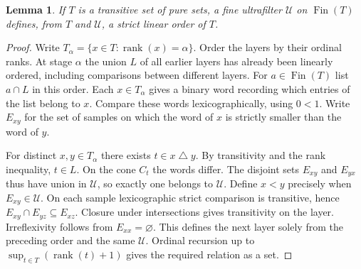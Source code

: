 \documentclass[11pt]{article}
\newtheorem{lemma}[theorem]{Lemma}
\newcommand{\Fin}{\operatorname{Fin}}
\newcommand{\UU}{\mathcal U}
\begin{document}
\begin{lemma}\label{order}
If $T$ is a transitive set of pure sets, a fine ultrafilter $\UU$ on $\Fin(T)$ defines, from $T$ and $\UU$, a strict linear order of $T$.
\end{lemma}
\begin{proof}
Write $T_\alpha=\{x\in T:\operatorname{rank}(x)=\alpha\}$. Order the layers by their ordinal ranks. At stage $\alpha$ the union $L$ of all earlier layers has already been linearly ordered, including comparisons between different layers. For $a\in\Fin(T)$ list $a\cap L$ in this order. Each $x\in T_\alpha$ gives a binary word recording which entries of the list belong to $x$. Compare these words lexicographically, using $0<1$. Write $E_{xy}$ for the set of samples on which the word of $x$ is strictly smaller than the word of $y$.

For distinct $x,y\in T_\alpha$ there exists $t\in x\mathbin{\triangle}y$. By transitivity and the rank inequality, $t\in L$. On the cone $C_t$ the words differ. The disjoint sets $E_{xy}$ and $E_{yx}$ thus have union in $\UU$, so exactly one belongs to $\UU$. Define $x<y$ precisely when $E_{xy}\in\UU$. On each sample lexicographic strict comparison is transitive, hence $E_{xy}\cap E_{yz}\subseteq E_{xz}$. Closure under intersections gives transitivity on the layer. Irreflexivity follows from $E_{xx}=\varnothing$. This defines the next layer solely from the preceding order and the same $\UU$. Ordinal recursion up to $\sup_{t\in T}(\operatorname{rank}(t)+1)$ gives the required relation as a set.
\end{proof}
\end{document}
